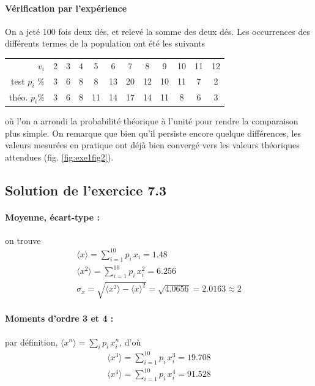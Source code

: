 \paragraph{Vérification par l'expérience} On a jeté 100 fois deux dés, et relevé la somme des deux dés. Les occurrences des différents termes de la population ont été les suivants
\begin{flushright}
\begin{tabular}{r|ccccccccccc}
$v_i$ & 2 & 3 & 4 & 5 & 6 & 7 & 8 & 9 & 10 & 11 & 12 \\
test $p_i$ \%& 3 & 6 & 8 & 8 & 13 & 20 & 12 & 10 & 11 & 7 & 2 \\
théo. $p_i$\% & 3 & 6 & 8 & 11 & 14 & 17 & 14 & 11 & 8 & 6 & 3 \\
\end{tabular}
\end{flushright}
où l'on a arrondi la probabilité théorique à l'unité pour rendre la comparaison plus simple. On remarque que bien qu'il persiste encore quelque différences, les valeurs mesurées en pratique ont déjà bien convergé vers les valeurs théoriques attendues (fig. \ref{fig:exe1fig2}).

\subsection*{Solution de l'exercice 7.3}

\paragraph{Moyenne, écart-type :} on trouve
\begin{gather*}
\langle x \rangle=\sum_{i=1}^{10}p_i\,x_i=1.48\\
\langle x^2 \rangle=\sum_{i=1}^{10}p_i\,x_i^2=6.256\\
\sigma_x=\sqrt{\langle x^2 \rangle-\langle x\rangle^2}=\sqrt{4.0656}=2.0163\approx 2
\end{gather*}

\paragraph{Moments d'ordre 3 et 4 :} par définition, $\langle x^n\rangle=\sum_ip_i\,x_i^n$, d'où
\begin{gather*}
\langle x^3 \rangle=\sum_{i=1}^{10}p_i\,x_i^3=19.708\\
\langle x^4 \rangle=\sum_{i=1}^{10}p_i\,x_i^4=91.528
\end{gather*}

